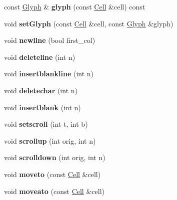 \begin{DoxyCompactItemize}
const \mbox{\hyperlink{structGlyph}{Glyph}} \& {\bfseries glyph} (const \mbox{\hyperlink{structCell}{Cell}} \&cell) const
\item 
\mbox{\label{classScreenImpl_a4bf8ebbdd68aa92a5c13f6c405691f00}} 
void {\bfseries set\+Glyph} (const \mbox{\hyperlink{structCell}{Cell}} \&cell, const \mbox{\hyperlink{structGlyph}{Glyph}} \&glyph)
\item 
\mbox{\label{classScreenImpl_a2ad4d7f0b4e17b42d31d552a4176bf0f}} 
void {\bfseries newline} (bool first\+\_\+col)
\item 
\mbox{\label{classScreenImpl_a4aaec3d4e2ab114a3c6fa05483f38125}} 
void {\bfseries deleteline} (int n)
\item 
\mbox{\label{classScreenImpl_a1c32481565ac31d2fff5469900268965}} 
void {\bfseries insertblankline} (int n)
\item 
\mbox{\label{classScreenImpl_a018f5ae0fe6eedd44476f8041c4fb341}} 
void {\bfseries deletechar} (int n)
\item 
\mbox{\label{classScreenImpl_abdbcd1be8f7d30bb42d325e74c0d362f}} 
void {\bfseries insertblank} (int n)
\item 
\mbox{\label{classScreenImpl_a08f7b7861b709f815b80cc36c396d046}} 
void {\bfseries setscroll} (int t, int b)
\item 
\mbox{\label{classScreenImpl_ac88b417228e739e1086476aa0061839a}} 
void {\bfseries scrollup} (int orig, int n)
\item 
\mbox{\label{classScreenImpl_ad8959514621d9b75810684d7bc090ef5}} 
void {\bfseries scrolldown} (int orig, int n)
\item 
\mbox{\label{classScreenImpl_ac98268ea6c8116c1bea3fa52c04b6370}} 
void {\bfseries moveto} (const \mbox{\hyperlink{structCell}{Cell}} \&cell)
\item 
\mbox{\label{classScreenImpl_a3067cef28925006ef79b4fb3a48fd102}} 
void {\bfseries moveato} (const \mbox{\hyperlink{structCell}{Cell}} \&cell)

\end{DoxyCompactItemize}
